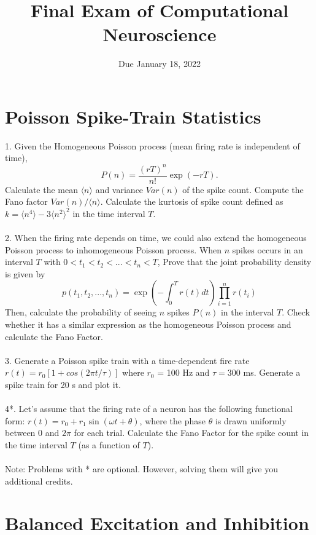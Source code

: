 \documentclass{article}
\title{Final Exam of Computational Neuroscience}
\date{Due January 18, 2022}
\begin{document}
\maketitle

\section*{Poisson Spike-Train Statistics}
1. Given the Homogeneous Poisson process (mean firing rate is independent of time), 
\begin{equation}
P(n)= \frac{(rT)^n}{n!}\exp(-rT).
\end{equation}
Calculate the mean $\langle n \rangle$ and variance $Var(n)$ of the spike count. Compute the Fano factor $Var(n)/\langle n \rangle$. 
Calculate the kurtosis of spike count defined as $k = \langle n^4 \rangle - 3 \langle n^2 \rangle^2$ in the time interval $T$. 
\\
\\
2. When the firing rate depends on time, we could also extend the homogeneous Poisson process to inhomogeneous Poisson process. When $n$ spikes occurs in an interval $T$ with $0<t_1<t_2<...<t_n<T$,  Prove that  the joint probability density is given by 
\begin{equation}
p(t_1,t_2,...,t_n)=\exp\left(-\int_0^Tr(t)dt\right)\prod_{i=1}^{n}r(t_i)
\end{equation}
Then, calculate the probability of seeing $n$ spikes $P(n)$ in the interval $T$. Check whether it has a similar expression as the homogeneous Poisson process and calculate the Fano Factor.
\\
\\
3. Generate a Poisson spike train with a time-dependent fire rate $r(t) = r_0[1 + cos(2\pi t/\tau)]$ where $r_0$ = 100 Hz and $\tau = 300$ ms. Generate a spike train for 20 s and plot it.
\\
\\
4*. Let's assume that the firing rate of a neuron has the following functional form: $r(t)=r_0+r_1\sin(\omega t+\theta)$, where the phase $\theta$  is drawn uniformly between $0$ and $2\pi$ for each trial. Calculate the Fano Factor for the spike count in the time interval $T$ (as a function of $T$).
\\
\\
Note: Problems with * are optional. However, solving them will give you additional credits.

\section*{Balanced Excitation and Inhibition}
\end{document}
